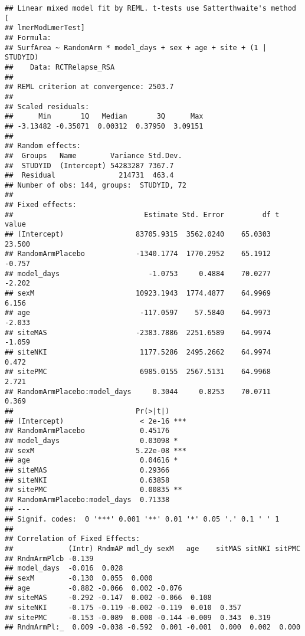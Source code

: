 \documentclass[]{article}
\theoremstyle{definition}
\theoremstyle{definition}
\theoremstyle{definition}
\theoremstyle{remark}
\begin{document}
\begin{verbatim}
## Linear mixed model fit by REML. t-tests use Satterthwaite's method [
## lmerModLmerTest]
## Formula: 
## SurfArea ~ RandomArm * model_days + sex + age + site + (1 | STUDYID)
##    Data: RCTRelapse_RSA
## 
## REML criterion at convergence: 2503.7
## 
## Scaled residuals: 
##      Min       1Q   Median       3Q      Max 
## -3.13482 -0.35071  0.00312  0.37950  3.09151 
## 
## Random effects:
##  Groups   Name        Variance Std.Dev.
##  STUDYID  (Intercept) 54283287 7367.7  
##  Residual               214731  463.4  
## Number of obs: 144, groups:  STUDYID, 72
## 
## Fixed effects:
##                               Estimate Std. Error         df t value
## (Intercept)                 83705.9315  3562.0240    65.0303  23.500
## RandomArmPlacebo            -1340.1774  1770.2952    65.1912  -0.757
## model_days                     -1.0753     0.4884    70.0277  -2.202
## sexM                        10923.1943  1774.4877    64.9969   6.156
## age                          -117.0597    57.5840    64.9973  -2.033
## siteMAS                     -2383.7886  2251.6589    64.9974  -1.059
## siteNKI                      1177.5286  2495.2662    64.9974   0.472
## sitePMC                      6985.0155  2567.5131    64.9968   2.721
## RandomArmPlacebo:model_days     0.3044     0.8253    70.0711   0.369
##                             Pr(>|t|)    
## (Intercept)                  < 2e-16 ***
## RandomArmPlacebo             0.45176    
## model_days                   0.03098 *  
## sexM                        5.22e-08 ***
## age                          0.04616 *  
## siteMAS                      0.29366    
## siteNKI                      0.63858    
## sitePMC                      0.00835 ** 
## RandomArmPlacebo:model_days  0.71338    
## ---
## Signif. codes:  0 '***' 0.001 '**' 0.01 '*' 0.05 '.' 0.1 ' ' 1
## 
## Correlation of Fixed Effects:
##             (Intr) RndmAP mdl_dy sexM   age    sitMAS sitNKI sitPMC
## RndmArmPlcb -0.139                                                 
## model_days  -0.016  0.028                                          
## sexM        -0.130  0.055  0.000                                   
## age         -0.882 -0.066  0.002 -0.076                            
## siteMAS     -0.292 -0.147  0.002 -0.066  0.108                     
## siteNKI     -0.175 -0.119 -0.002 -0.119  0.010  0.357              
## sitePMC     -0.153 -0.089  0.000 -0.144 -0.009  0.343  0.319       
## RndmArmPl:_  0.009 -0.038 -0.592  0.001 -0.001  0.000  0.002  0.000
\end{verbatim}
\end{document}
